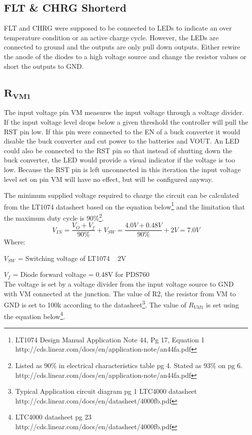 \documentclass{article}
\begin{document}
\subsection{FLT \& CHRG Shorterd}
FLT and CHRG were supposed to be connected to LEDs to indicate an over temperature condition or an active charge cycle. However, the LEDs are connected to ground and the outputs are only pull down outputs. Either rewire the anode of the diodes to a high voltage source and change the resistor values or short the outputs to GND.

\subsection{$\mathbf{R_{VM1}}$}
The input voltage pin VM measures the input voltage through a voltage divider. If the input voltage level drops below a given threshold the controller will pull the RST pin low. If this pin were connected to the EN of a buck converter it would disable the buck converter and cut power to the batteries and VOUT. An LED could also be connected to the RST pin so that instead of shutting down the buck converter, the LED would provide a visual indicator if the voltage is too low. Because the RST pin is left unconnected in this iteration the input voltage level set on pin VM will have no effect, but will be configured anyway. 

The minimum supplied voltage required to charge the circuit can be calculated from the LT1074 datasheet based on the equation below\footnote{LT1074 Design Manual Application Note 44, Pg 17, Equation 1 http://cds.linear.com/docs/en/application-note/an44fa.pdf} and the limitation that the maximum duty cycle is 90\%\footnote{Listed as 90\% in electrical characteristics table pg 4. Stated as 93\% on pg 6. http://cds.linear.com/docs/en/application-note/an44fa.pdf}. 
\[V_{IN} = \frac{V_O + V_f}{90\%} + V_{SW} =  \frac{4.0V + 0.48V}{90\%} + 2V = 7.0V\]
Where:

$V_{SW}$ = Switching voltage of LT1074 ~ 2V

$V_{f}$ = Diode forward voltage = 0.48V for PDS760\\

The voltage is set by a voltage divider from the input voltage source to GND with VM connected at the junction. The value of R2, the resistor from VM to GND is set to 100k according to the datasheet\footnote{Typical Application circuit diagram pg 1 LTC4000 datasheet http://cds.linear.com/docs/en/datasheet/4000fb.pdf}. The value of $R_{VM1}$ is set using the equation below\footnote{LTC4000 datasheet pg 23 http://cds.linear.com/docs/en/datasheet/4000fb.pdf}.
\end{document}
